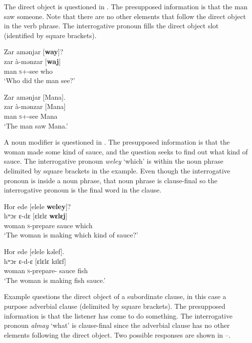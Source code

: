 \largerpage The direct object is questioned in . The presupposed information is that the man saw someone. Note that there are no other elements that follow the direct object in the verb phrase. The interrogative pronoun fills the direct object slot (identified by square brackets). 


\ea \label{ex:10:53}
Zar  amənjar  [\textbf{way}]?\\
\gll  zar     à-mənzar   [\textbf{waj}]\\
      man    \textsc{s}+{\PFV}-see  who\\
\glt  ‘Who did the man see?’ 
\z

\ea \label{ex:10:54}
Zar  amənjar  [Mana].\\
\gll  zar     à-mənzar   [Mana]\\
      man    \textsc{s}+{\PFV}-see  Mana\\
\glt  ‘The man saw Mana.’ 
\z

A noun modifier is questioned in . The presupposed information is that the woman made some kind of sauce, and the question seeks to find out what kind of sauce. The interrogative pronoun \textit{weley} ‘which’ is within the noun phrase delimited by square brackets in the example. Even though the interrogative pronoun is inside a noun phrase, that noun phrase is clause-final so the interrogative pronoun is the final word in the clause. 

\ea \label{ex:10:55}
Hor  ede  [elele  \textbf{weley}]?\\
\gll  hʷɔr    ɛ-dɛ    [ɛlɛlɛ  \textbf{wɛlɛj}]\\
      woman  \textsc{s}-prepare  sauce  which\\
\glt  ‘The woman is making which kind of sauce?’
\z

\ea \label{ex:10:56}
Hor  ede  [elele  kəlef].\\
\gll  hʷɔr    ɛ{}-d-ɛ    [ɛlɛlɛ  kɪlɛf]\\
      woman  \textsc{s}-prepare-{\CL}  sauce  fish\\
\glt  ‘The woman is making fish sauce.’
\z

Example  questions the direct object of a subordinate clause, in this case a purpose adverbial clause (delimited by square brackets). The presupposed information is that the listener has come to do something. The interrogative pronoun \textit{almay}  ‘what’ is clause-final since the adverbial clause has no other elements following the direct object. Two possible responses are shown in --.

